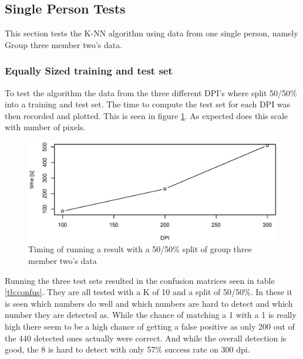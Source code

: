 

\subsection{Single Person Tests}
This section tests the K-NN algorithm using data from one single person, namely Group three member two's data.
%
%
%
%

\subsubsection{Equally Sized training and test set}
To test the algorithm the data from the three different DPI's where split 50/50\% into a training and test set. 
The time to compute the test set for each DPI was then recorded and plotted. This is seen in figure \ref{fig:PersonDependent_5050}.
As expected does this scale with number of pixels. 

\begin{figure}[h]
\centering
\includegraphics[width=\textwidth]{graphics/time_vs_dpi}
\caption{Timing of running a result with a 50/50\% split of group three member two's data}
\label{fig:PersonDependent_5050}
\end{figure}

Running the three test sets resulted in the confusion matrices seen in table \ref{tb:confus}.
They are all tested with a K of 10 and a split of 50/50\%.
In these it is seen which numbers do well and which numbers are hard to detect and which number they are detected as.
While the chance of matching a 1 with a 1 is really high there seem to be a high chance of getting a false positive as only 200 out of the 440 detected ones actually were correct.
And while the overall detection is good, the 8 is hard to detect with only 57\% success rate on 300 dpi.


